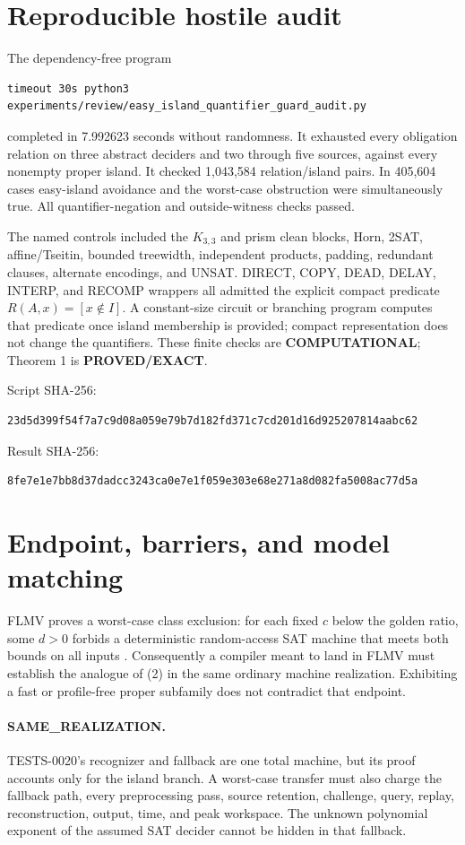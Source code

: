 \documentclass[11pt]{article}
\newcommand{\EXACT}{\textbf{PROVED/EXACT}}
\newcommand{\COMP}{\textbf{COMPUTATIONAL}}
\begin{document}
\section{Reproducible hostile audit}

The dependency-free program
\begin{verbatim}
timeout 30s python3 experiments/review/easy_island_quantifier_guard_audit.py
\end{verbatim}
completed in 7.992623 seconds without randomness.  It exhausted every
obligation relation on three abstract deciders and two through five sources,
against every nonempty proper island.  It checked 1,043,584 relation/island
pairs.  In 405,604 cases easy-island avoidance and the worst-case obstruction
were simultaneously true.  All quantifier-negation and outside-witness checks
passed.

The named controls included the $K_{3,3}$ and prism clean blocks, Horn, 2SAT,
affine/Tseitin, bounded treewidth, independent products, padding, redundant
clauses, alternate encodings, and UNSAT.  DIRECT, COPY, DEAD, DELAY, INTERP,
and RECOMP wrappers all admitted the explicit compact predicate
$R(A,x)=[x\notin I]$.  A constant-size circuit or branching program computes
that predicate once island membership is provided; compact representation
does not change the quantifiers.  These finite checks are \COMP; Theorem 1 is
\EXACT.

Script SHA-256:
\begin{verbatim}
23d5d399f54f7a7c9d08a059e79b7d182fd371c7cd201d16d925207814aabc62
\end{verbatim}
Result SHA-256:
\begin{verbatim}
8fe7e1e7bb8d37dadcc3243ca0e7e1f059e303e68e271a8d082fa5008ac77d5a
\end{verbatim}

\section{Endpoint, barriers, and model matching}

FLMV proves a worst-case class exclusion: for each fixed $c$ below the golden
ratio, some $d>0$ forbids a deterministic random-access SAT machine that
meets both bounds on all inputs \cite{FLMV05}.  Consequently a compiler meant
to land in FLMV must establish the analogue of (2) in the same ordinary
machine realization.  Exhibiting a fast or profile-free proper subfamily does
not contradict that endpoint.

\paragraph{SAME\_REALIZATION.}
TESTS-0020's recognizer and fallback are one total machine, but its proof
accounts only for the island branch.  A worst-case transfer must also charge
the fallback path, every preprocessing pass, source retention, challenge,
query, replay, reconstruction, output, time, and peak workspace.  The unknown
polynomial exponent of the assumed SAT decider cannot be hidden in that
fallback.
\end{document}
